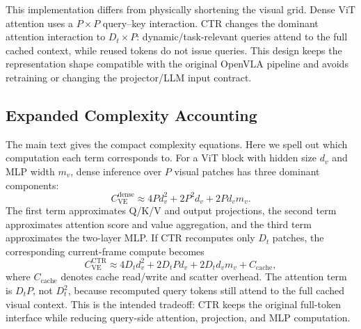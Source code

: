 \begin{table}[h]
\centering
\small
{}
\caption{Vision-encoder dataflow under CTR. Reused tokens do not issue current-frame queries and do not run the block MLP, but the full token order is restored after each block.}
\label{tab:appendix_ve_dataflow}
\end{table}

This implementation differs from physically shortening the visual grid.
Dense ViT attention uses a $P\times P$ query--key interaction.
CTR changes the dominant attention interaction to $D_t\times P$: dynamic/task-relevant queries attend to the full cached context, while reused tokens do not issue queries.
This design keeps the representation shape compatible with the original OpenVLA pipeline and avoids retraining or changing the projector/LLM input contract.

\subsection{Expanded Complexity Accounting}
The main text gives the compact complexity equations.
Here we spell out which computation each term corresponds to.
For a ViT block with hidden size $d_v$ and MLP width $m_v$, dense inference over $P$ visual patches has three dominant components:
\begin{equation}
    C_{\mathrm{VE}}^{\mathrm{dense}}
    \approx 4P d_v^2 + 2P^2 d_v + 2P d_v m_v.
\end{equation}
The first term approximates Q/K/V and output projections, the second term approximates attention score and value aggregation, and the third term approximates the two-layer MLP.
If CTR recomputes only $D_t$ patches, the corresponding current-frame compute becomes
\begin{equation}
    C_{\mathrm{VE}}^{\mathrm{CTR}}
    \approx 4D_t d_v^2 + 2D_tP d_v + 2D_t d_v m_v + C_{\mathrm{cache}},
\end{equation}
where $C_{\mathrm{cache}}$ denotes cache read/write and scatter overhead.
The attention term is $D_tP$, not $D_t^2$, because recomputed query tokens still attend to the full cached visual context.
This is the intended tradeoff: CTR keeps the original full-token interface while reducing query-side attention, projection, and MLP computation.


